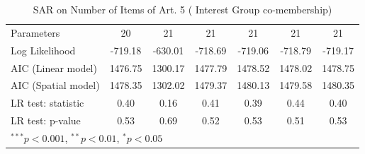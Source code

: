 \begin{table}[!h]
\begin{center}
\begin{tabular}{l c c c c c c }
Parameters              & 20           & 21           & 21           & 21           & 21           & 21           \\
Log Likelihood          & -719.18      & -630.01      & -718.69      & -719.06      & -718.79      & -719.17      \\
AIC (Linear model)      & 1476.75      & 1300.17      & 1477.79      & 1478.52      & 1478.02      & 1478.75      \\
AIC (Spatial model)     & 1478.35      & 1302.02      & 1479.37      & 1480.13      & 1479.58      & 1480.35      \\
LR test: statistic      & 0.40         & 0.16         & 0.41         & 0.39         & 0.44         & 0.40         \\
LR test: p-value        & 0.53         & 0.69         & 0.52         & 0.53         & 0.51         & 0.53         \\
\bottomrule
\multicolumn{7}{l}{\scriptsize{$^{***}p<0.001$, $^{**}p<0.01$, $^*p<0.05$}}
\end{tabular}
\caption{SAR on Number of Items of Art. 5 ( Interest Group co-membership)}
\label{table:coefficients}
\end{center}
\end{table}

